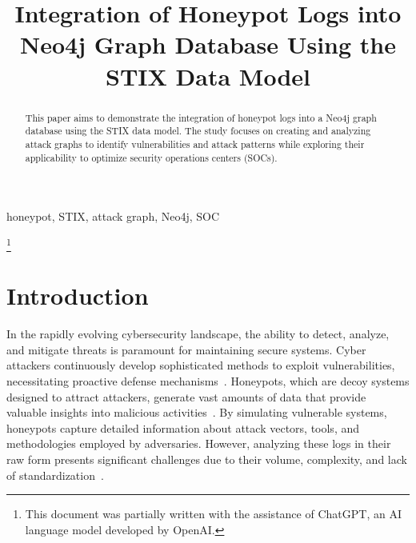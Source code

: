 \documentclass[conference]{IEEEtran}
\begin{document}
\title{Integration of Honeypot Logs into Neo4j Graph Database Using the STIX Data Model}

\author{
}

\maketitle

\begin{abstract}
This paper aims to demonstrate the integration of honeypot logs into a Neo4j graph database using the STIX data model. The study focuses on creating and analyzing attack graphs to identify vulnerabilities and attack patterns while exploring their applicability to optimize security operations centers (SOCs).
\end{abstract}

\begin{IEEEkeywords}
honeypot, STIX, attack graph, Neo4j, SOC
\end{IEEEkeywords}

\thanks{This document was partially written with the assistance of ChatGPT, an AI language model developed by OpenAI.\cite{openai2024chatgpt}}

\section{Introduction}

In the rapidly evolving cybersecurity landscape, the ability to detect, analyze, and mitigate threats is paramount for maintaining secure systems. Cyber attackers continuously develop sophisticated methods to exploit vulnerabilities, necessitating proactive defense mechanisms~\cite{mirkovic2004taxonomy}. Honeypots, which are decoy systems designed to attract attackers, generate vast amounts of data that provide valuable insights into malicious activities~\cite{spitzner2003honeypots, provos2007virtual}. By simulating vulnerable systems, honeypots capture detailed information about attack vectors, tools, and methodologies employed by adversaries. However, analyzing these logs in their raw form presents significant challenges due to their volume, complexity, and lack of standardization~\cite{katti2018honeypot}.
\end{document}
